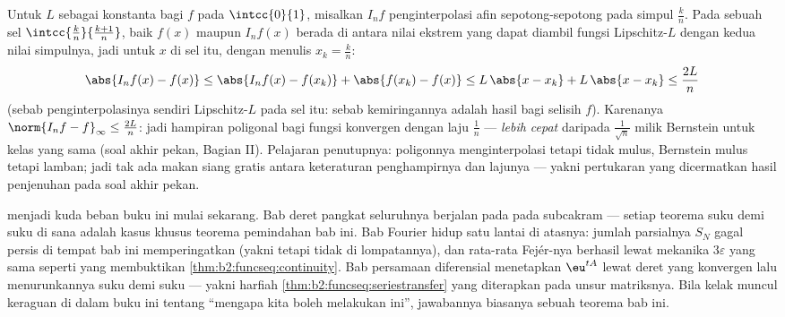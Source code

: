 \begin{example}\label{ex:b2:funcseq:polygonal}
Untuk $L$ sebagai konstanta  bagi $f$ pada $\intcc{0}{1}$, misalkan $I_nf$
penginterpolasi afin sepotong-sepotong pada simpul $\frac kn$. Pada
sebuah sel $\intcc{\frac kn}{\frac{k+1}n}$, baik $f(x)$ maupun
$I_nf(x)$ berada di antara nilai ekstrem yang dapat diambil fungsi
Lipschitz-$L$ dengan kedua nilai simpulnya, jadi untuk $x$ di
sel itu, dengan menulis $x_k = \frac kn$:
\[
\abs{I_nf(x) - f(x)}
\leq \abs{I_nf(x) - f(x_k)} + \abs{f(x_k) - f(x)}
\leq L\,\abs{x - x_k} + L\,\abs{x - x_k}
\leq \frac{2L}{n}
\]
(sebab penginterpolasinya sendiri Lipschitz-$L$ pada sel itu: sebab
kemiringannya adalah hasil bagi selisih $f$). Karenanya $\norm{I_nf -
f}_\infty \leq \frac{2L}{n}$: jadi hampiran poligonal bagi fungsi
 konvergen dengan laju $\frac1n$ ---
\emph{lebih cepat} daripada $\frac{1}{\sqrt n}$ milik Bernstein untuk
kelas yang sama (soal akhir pekan, Bagian II). Pelajaran penutupnya:
poligonnya menginterpolasi tetapi tidak mulus, Bernstein mulus
tetapi lamban; jadi tak ada makan siang gratis antara keteraturan
penghampirnya dan lajunya --- yakni pertukaran yang dicermatkan
hasil penjenuhan pada soal akhir pekan.
\end{example}

\begin{remark}
 menjadi kuda beban buku ini mulai sekarang. Bab
deret pangkat seluruhnya berjalan pada  pada
subcakram  --- setiap teorema suku demi suku di sana adalah
kasus khusus teorema pemindahan bab ini. Bab Fourier
hidup satu lantai di atasnya: jumlah parsialnya $S_N$ gagal
persis di tempat bab ini memperingatkan (yakni  tetapi
tidak  di lompatannya), dan rata-rata Fejér-nya berhasil lewat
mekanika $3\varepsilon$ yang sama seperti yang membuktikan
\cref{thm:b2:funcseq:continuity}. Bab persamaan diferensial
menetapkan $\eu^{tA}$ lewat deret yang konvergen  lalu
menurunkannya suku demi suku --- yakni harfiah
\cref{thm:b2:funcseq:seriestransfer} yang diterapkan pada unsur
matriksnya. Bila kelak muncul keraguan di dalam buku ini tentang
``mengapa kita boleh melakukan ini'', jawabannya biasanya sebuah
teorema bab ini.
\end{remark}

